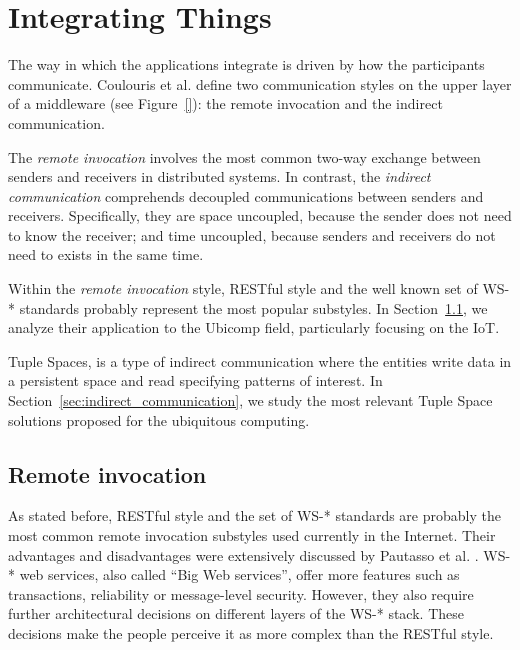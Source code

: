 \section{Integrating Things}
\label{sec:integration}

The way in which the applications integrate is driven by how the participants communicate.
Coulouris et al. \cite{coulouris_distributed_2012} define two communication styles on the upper layer of a middleware (see Figure~\ref{}): %
the remote invocation and the indirect communication.


The \emph{remote invocation} involves the most common two-way exchange between senders and receivers in distributed systems.
In contrast, the \emph{indirect communication} comprehends decoupled communications between senders and receivers.
Specifically, they are space uncoupled, because the sender does not need to know the receiver;
and time uncoupled, because senders and receivers do not need to exists in the same time.


Within the \emph{remote invocation} style, RESTful style \cite{fielding_architectural_2000} and the well known set of WS-* \cite{} standards probably represent the most popular substyles.
In Section~\ref{sec:remote_invocation}, we analyze their application to the Ubicomp field, particularly focusing on the IoT.


Tuple Spaces, is a type of indirect communication where the entities write data in a persistent space and read specifying patterns of interest.
In Section~\ref{sec:indirect_communication}, we study the most relevant Tuple Space solutions proposed for the ubiquitous computing.



\subsection{Remote invocation}
\label{sec:remote_invocation}

As stated before, RESTful style and the set of WS-* standards are probably the most common remote invocation substyles used currently in the Internet.
Their advantages and disadvantages were extensively discussed by Pautasso et al. \cite{pautasso_restful_2008}.
WS-* web services, also called ``Big Web services'', offer more features such as transactions, reliability or message-level security.
However, they also require further architectural decisions on different layers of the WS-* stack.
These decisions make the people perceive it as more complex than the RESTful style. %


